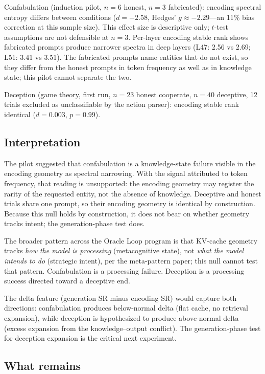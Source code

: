 \documentclass[11pt,a4paper]{article}
\begin{document}
Confabulation (induction pilot, $n = 6$ honest, $n = 3$ fabricated):
encoding spectral entropy differs between conditions ($d = -2.58$,
Hedges' $g \approx -2.29$---an 11\% bias correction at this sample size).
This effect size is descriptive only; $t$-test assumptions are not
defensible at $n = 3$. Per-layer encoding stable rank shows fabricated
prompts produce narrower spectra in deep layers (L47: 2.56 vs 2.69;
L51: 3.41 vs 3.51). The fabricated prompts name entities that do not
exist, so they differ from the honest prompts in token frequency as
well as in knowledge state; this pilot cannot separate the two.

Deception (game theory, first run, $n = 23$ honest cooperate, $n = 40$ deceptive,
12 trials excluded as unclassifiable by the action parser):
encoding stable rank identical ($d = 0.003$, $p = 0.99$).

\subsection{Interpretation}

The pilot suggested that confabulation is a knowledge-state failure
visible in the encoding geometry as spectral narrowing. With the signal
attributed to token frequency, that reading is unsupported: the encoding
geometry may register the rarity of the requested entity, not the
absence of knowledge. Deceptive and honest trials share one prompt, so
their encoding geometry is identical by construction. Because this
null holds by construction, it does not bear on whether geometry tracks
intent; the generation-phase test does.

The broader pattern across the Oracle Loop program is that KV-cache
geometry tracks \emph{how the model is processing} (metacognitive
state), not \emph{what the model intends to do} (strategic intent),
per the meta-pattern paper; this null cannot test that pattern. Confabulation is a processing
failure. Deception is a processing success directed toward a deceptive
end.

The delta feature (generation SR minus encoding SR) would capture both
directions: confabulation produces below-normal delta (flat cache,
no retrieval expansion), while deception is hypothesized to produce
above-normal delta (excess expansion from the knowledge--output
conflict). The generation-phase test for deception expansion is the
critical next experiment.

\subsection{What remains}
\end{document}
